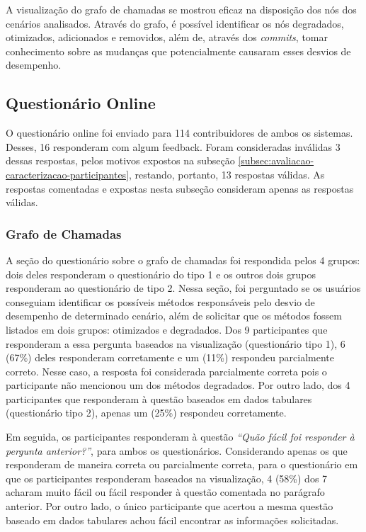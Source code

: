 A visualização do grafo de chamadas se mostrou eficaz na disposição dos nós dos cenários analisados. Através do grafo, é possível identificar os nós degradados, otimizados, adicionados e removidos, além de, através dos \textit{commits}, tomar conhecimento sobre as mudanças que potencialmente causaram esses desvios de desempenho.

\subsection{Questionário Online} \label{subsec:avaliacao-questionario-online}

O questionário online foi enviado para 114 contribuidores de ambos os sistemas. Desses, 16 responderam com algum feedback. Foram consideradas inválidas 3 dessas respostas, pelos motivos expostos na subseção \ref{subsec:avaliacao-caracterizacao-participantes}, restando, portanto, 13 respostas válidas. As respostas comentadas e expostas nesta subseção consideram apenas as respostas válidas.

\subsubsection{Grafo de Chamadas}

A seção do questionário sobre o grafo de chamadas foi respondida pelos 4 grupos: dois deles responderam o questionário do tipo 1 e os outros dois grupos responderam ao questionário de tipo 2. Nessa seção, foi perguntado se os usuários conseguiam identificar os possíveis métodos responsáveis pelo desvio de desempenho de determinado cenário, além de solicitar que os métodos fossem listados em dois grupos: otimizados e degradados. Dos 9 participantes que responderam a essa pergunta baseados na visualização (questionário tipo 1), 6 (67\%) deles responderam corretamente e um (11\%) respondeu parcialmente correto. Nesse caso, a resposta foi considerada parcialmente correta pois o participante não mencionou um dos métodos degradados. Por outro lado, dos 4 participantes que responderam à questão baseados em dados tabulares (questionário tipo 2), apenas um (25\%) respondeu corretamente.

Em seguida, os participantes responderam à questão \textit{``Quão fácil foi responder à pergunta anterior?''}, para ambos os questionários. Considerando apenas os que responderam de maneira correta ou parcialmente correta, para o questionário em que os participantes responderam baseados na visualização, 4 (58\%) dos 7 acharam muito fácil ou fácil responder à questão comentada no parágrafo anterior. Por outro lado, o único participante que acertou a mesma questão baseado em dados tabulares achou fácil encontrar as informações solicitadas.

